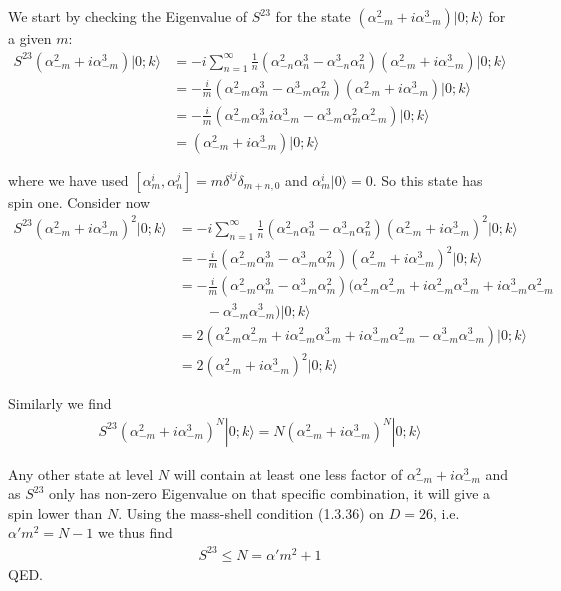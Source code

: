 \begin{tcolorbox}[breakable]
	We start by checking the Eigenvalue of $S^{23}$ for the state $(\alpha^2_{-m} + i\alpha^3_{-m}) |0;k\rangle$ for a given $m$:
	\begin{align}
		S^{23} (\alpha^2_{-m} + i\alpha^3_{-m}) |0;k\rangle 
		&= -i \sum_{n=1}^{\infty} \frac{1}{n} (\alpha^2_{-n} \alpha^3_n - \alpha^3_{-n} \alpha^2_n)(\alpha^2_{-m} + i\alpha^3_{-m}) |0;k\rangle \nonumber \\[6pt]
		&= -\frac{i}{m} (\alpha^2_{-m} \alpha^3_m - \alpha^3_{-m} \alpha^2_m)(\alpha^2_{-m} + i\alpha^3_{-m}) |0;k\rangle \nonumber \\[6pt]
		&= -\frac{i}{m} (\alpha^2_{-m} \alpha^3_m i\alpha^3_{-m} - \alpha^3_{-m} \alpha^2_m \alpha^2_{-m}) |0;k\rangle \nonumber \\[6pt]
		&= (\alpha^2_{-m} + i\alpha^3_{-m}) |0;k\rangle
		\tag{1.53}
	\end{align}
	
	where we have used $[\alpha^i_m,\alpha^j_n] = m\delta^{ij}\delta_{m+n,0}$ and $\alpha_{m}^i|0\rangle=0$. 	So this state has spin one. Consider now
	\begin{align}
		S^{23} (\alpha^2_{-m} + i\alpha^3_{-m})^2 |0;k\rangle 
		&= -i \sum_{n=1}^{\infty} \frac{1}{n} (\alpha^2_{-n}\alpha^3_n - \alpha^3_{-n}\alpha^2_n)(\alpha^2_{-m} + i\alpha^3_{-m})^2 |0;k\rangle \nonumber \\[6pt]
		&= -\frac{i}{m} (\alpha^2_{-m}\alpha^3_m - \alpha^3_{-m}\alpha^2_m)(\alpha^2_{-m} + i\alpha^3_{-m})^2 |0;k\rangle \nonumber \\[6pt]
		&= -\frac{i}{m} (\alpha^2_{-m}\alpha^3_m - \alpha^3_{-m}\alpha^2_m)
		(\alpha^2_{-m}\alpha^2_{-m}+ i\alpha^2_{-m}\alpha^3_{-m} + i\alpha^3_{-m}\alpha^2_{-m} \nonumber\\
		&\qquad - \alpha^3_{-m}\alpha^3_{-m}) |0;k\rangle \nonumber \\[6pt]
		&= 2(\alpha^2_{-m}\alpha^2_{-m} + i\alpha^2_{-m}\alpha^3_{-m} + i\alpha^3_{-m}\alpha^2_{-m} - \alpha^3_{-m}\alpha^3_{-m}) |0;k\rangle \nonumber \\[6pt]
		&= 2(\alpha^2_{-m} + i\alpha^3_{-m})^2 |0;k\rangle
		\tag{1.54}
	\end{align}
	
	Similarly we find
	\begin{align}
		S^{23} (\alpha^2_{-m} + i\alpha^3_{-m})^N |0;k\rangle 
		= N (\alpha^2_{-m} + i\alpha^3_{-m})^N |0;k\rangle
		\tag{1.55}
	\end{align}
	
	Any other state at level $N$ will contain at least one less factor of 
	$\alpha^2_{-m} + i\alpha^3_{-m}$ and as $S^{23}$ only has non-zero Eigenvalue 
	on that specific combination, it will give a spin lower than $N$. 
	Using the mass-shell condition (1.3.36) on $D=26$, i.e. $\alpha' m^2 = N - 1$ 
	we thus find
	\begin{align}
		S^{23} \le N = \alpha' m^2 + 1
		\tag{1.56}
	\end{align}
	QED.
\end{tcolorbox}
